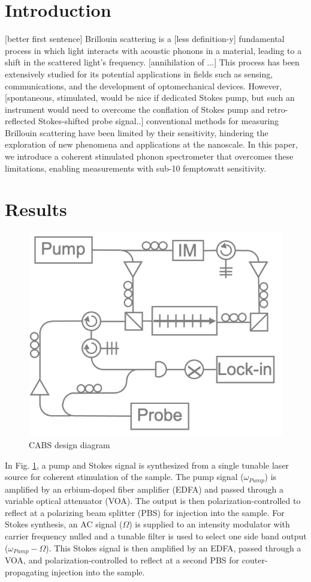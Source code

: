 \documentclass[sn-nature]{sn-jnl}%
\begin{document}
\maketitle

\section{Introduction}
\label{Intro}

[better first sentence] Brillouin scattering is a [less definition-y] fundamental process in which light interacts with acoustic phonons in a material, leading to a shift in the scattered light's frequency. [annihilation of ...] This process has been extensively studied for its potential applications in fields such as sensing, communications, and the development of optomechanical devices. However, [spontaneous, stimulated, would be nice if dedicated Stokes pump, but such an instrument would need to overcome the conflation of Stokes pump and retro-reflected Stokes-shifted probe signal..] conventional methods for measuring Brillouin scattering have been limited by their sensitivity, hindering the exploration of new phenomena and applications at the nanoscale. In this paper, we introduce a coherent stimulated phonon spectrometer that overcomes these limitations, enabling measurements with sub-10 femptowatt sensitivity.


\section{Results}\label{Results}

\begin{figure}[t]
\centering
\includegraphics[width=.45\textwidth]{CABS.png}
\caption{CABS design diagram}\label{fig:CABS}
\end{figure}

In Fig. \ref{fig:CABS}, a pump and Stokes signal is synthesized from a single tunable laser source for coherent stimulation of the sample. The pump signal ($\omega_{Pump}$) is amplified by an erbium-doped fiber amplifier (EDFA) and passed through a variable optical attenuator (VOA). The output is then polarization-controlled to reflect at a polarizing beam splitter (PBS) for injection into the sample. For Stokes synthesis, an AC signal ($\Omega$) is supplied to an intensity modulator with carrier frequency nulled and a tunable filter is used to select one side band output ($\omega_{Pump} - \Omega$). This Stokes signal is then amplified by an EDFA, passed through a VOA, and polarization-controlled to reflect at a second PBS for couter-propagating injection into the sample.
\end{document}
